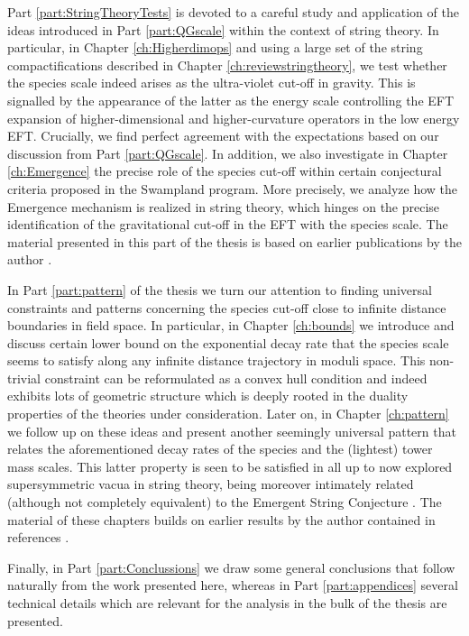 Part \ref{part:StringTheoryTests} is devoted to a careful study and application of the ideas introduced in Part \ref{part:QGscale} within the context of string theory. In particular, in Chapter \ref{ch:Higherdimops} and using a large set of the string compactifications described in Chapter \ref{ch:reviewstringtheory}, we test whether the species scale indeed arises as the ultra-violet cut-off in gravity. This is signalled by the appearance of the latter as the energy scale controlling the EFT expansion of higher-dimensional and higher-curvature operators in the low energy EFT. Crucially, we find perfect agreement with the expectations based on our discussion from Part \ref{part:QGscale}. In addition, we also investigate in Chapter \ref{ch:Emergence} the precise role of the species cut-off within certain conjectural criteria proposed in the Swampland program. More precisely, we analyze how the Emergence mechanism \cite{Harlow:2015lma, Grimm:2018ohb, Heidenreich:2018kpg, Palti:2019pca} is realized in string theory, which hinges on the precise identification of the gravitational cut-off in the EFT with the species scale. The material presented in this part of the thesis is based on earlier publications by the author \cite{Castellano:2022bvr,Castellano:2023aum}.

In Part \ref{part:pattern} of the thesis we turn our attention to finding universal constraints and patterns concerning the species cut-off close to infinite distance boundaries in field space. In particular, in Chapter \ref{ch:bounds} we introduce and discuss certain lower bound on the exponential decay rate that the species scale seems to satisfy along any infinite distance trajectory in moduli space. This non-trivial constraint can be reformulated as a convex hull condition and indeed exhibits lots of geometric structure which is deeply rooted in the duality properties of the theories under consideration. Later on, in Chapter \ref{ch:pattern} we follow up on these ideas and present another seemingly universal pattern that relates the aforementioned decay rates of the species and the (lightest) tower mass scales. This latter property is seen to be satisfied in all up to now explored supersymmetric vacua in string theory, being moreover intimately related (although not completely equivalent) to the Emergent String Conjecture \cite{Lee:2019wij}. The material of these chapters builds on earlier results by the author contained in references \cite{Calderon-Infante:2023ler, Castellano:2023jjt, PhysRevLett.132.181601}.

Finally, in Part \ref{part:Conclussions} we draw some general conclusions that follow naturally from the work presented here, whereas in Part \ref{part:appendices} several technical details which are relevant for the analysis in the bulk of the thesis are presented.


